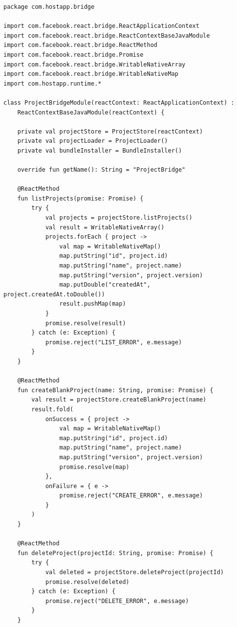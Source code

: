 \documentclass[11pt]{article}
\begin{document}
\begin{verbatim}
package com.hostapp.bridge

import com.facebook.react.bridge.ReactApplicationContext
import com.facebook.react.bridge.ReactContextBaseJavaModule
import com.facebook.react.bridge.ReactMethod
import com.facebook.react.bridge.Promise
import com.facebook.react.bridge.WritableNativeArray
import com.facebook.react.bridge.WritableNativeMap
import com.hostapp.runtime.*

class ProjectBridgeModule(reactContext: ReactApplicationContext) :
    ReactContextBaseJavaModule(reactContext) {

    private val projectStore = ProjectStore(reactContext)
    private val projectLoader = ProjectLoader()
    private val bundleInstaller = BundleInstaller()

    override fun getName(): String = "ProjectBridge"

    @ReactMethod
    fun listProjects(promise: Promise) {
        try {
            val projects = projectStore.listProjects()
            val result = WritableNativeArray()
            projects.forEach { project ->
                val map = WritableNativeMap()
                map.putString("id", project.id)
                map.putString("name", project.name)
                map.putString("version", project.version)
                map.putDouble("createdAt", project.createdAt.toDouble())
                result.pushMap(map)
            }
            promise.resolve(result)
        } catch (e: Exception) {
            promise.reject("LIST_ERROR", e.message)
        }
    }

    @ReactMethod
    fun createBlankProject(name: String, promise: Promise) {
        val result = projectStore.createBlankProject(name)
        result.fold(
            onSuccess = { project ->
                val map = WritableNativeMap()
                map.putString("id", project.id)
                map.putString("name", project.name)
                map.putString("version", project.version)
                promise.resolve(map)
            },
            onFailure = { e ->
                promise.reject("CREATE_ERROR", e.message)
            }
        )
    }

    @ReactMethod
    fun deleteProject(projectId: String, promise: Promise) {
        try {
            val deleted = projectStore.deleteProject(projectId)
            promise.resolve(deleted)
        } catch (e: Exception) {
            promise.reject("DELETE_ERROR", e.message)
        }
    }


\end{verbatim}
\end{document}
